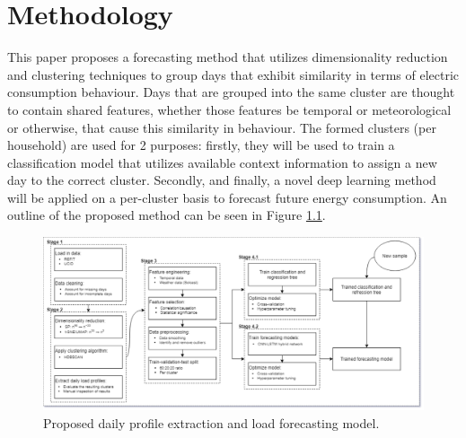 \chapter{Methodology}
\label{ch:Methodology}
This paper proposes a forecasting method that utilizes dimensionality reduction and clustering techniques to group days that exhibit similarity in terms of electric consumption behaviour. Days that are grouped into the same cluster are thought to contain shared features, whether those features be temporal or meteorological or otherwise, that cause this similarity in behaviour. The formed clusters (per household) are used for 2 purposes: firstly, they will be used to train a classification model that utilizes available context information to assign a new day to the correct cluster. Secondly, and finally, a novel deep learning method will be applied on a per-cluster basis to forecast future energy consumption. An outline of the proposed method can be seen in Figure \ref{fig:Proposed-Model}.

\begin{figure}[H]
    \begin{adjustwidth}{-3.0cm}{-3.0cm}%
        \centering
        \includegraphics[width=\linewidth]{Images/Chapter 6/Other/Proposed-Model.pdf}
        \caption{Proposed daily profile extraction and load forecasting model.}
        \label{fig:Proposed-Model}
    \end{adjustwidth}
\end{figure}

